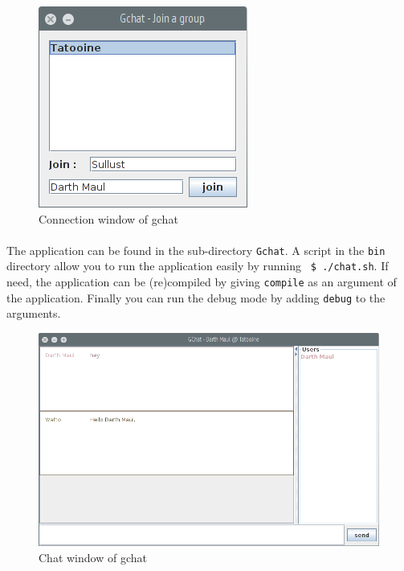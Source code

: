 \begin{figure}[h]
    \begin{center}
        \includegraphics[scale=0.6]{figures/gchat_connection.png}
    \end{center}
    \caption{Connection window of gchat}
    \label{fig:gchat_connect}
\end{figure}

\paragraph{}{
    The application can be found in the sub-directory \texttt{Gchat}. 
 A script in the \texttt{bin} directory allow you to run the application easily
 by running \texttt{ \$ ./chat.sh}. If need, the application can be (re)compiled by
 giving \texttt{compile} as an argument of the application. Finally you can run
 the debug mode by adding \texttt{debug} to the arguments.
}

\begin{figure}[h]
    \begin{center}
        \includegraphics[scale=0.4]{figures/gchat_chat.png}
    \end{center}
    \caption{Chat window of gchat}
    \label{fig:gchat_connectchat}
\end{figure}

